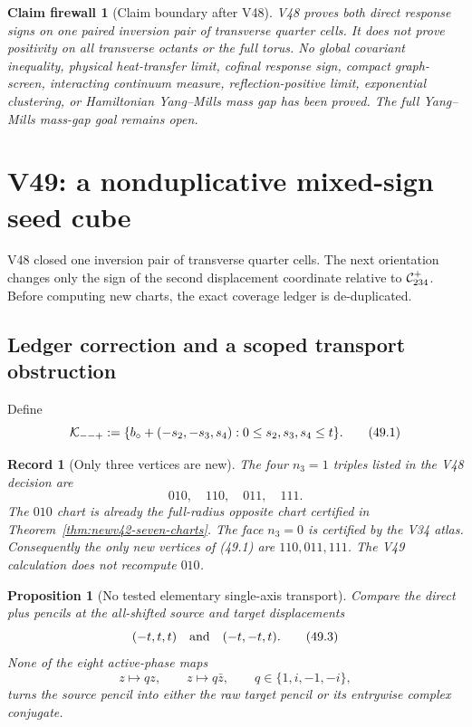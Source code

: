 \documentclass[11pt,oneside]{article}
\newtheorem{proposition}[theorem]{Proposition}
\newtheorem{firewall}[theorem]{Claim firewall}
\newtheorem{record}[theorem]{Record}
\theoremstyle{definition}
\theoremstyle{remark}
\begin{document}
\begin{firewall}[Claim boundary after V48]
\label{fire:newv48-final}
V48 proves both direct response signs on one paired inversion pair
of transverse quarter cells.  It does not prove positivity on all
transverse octants or the full torus.  No global covariant
inequality, physical heat-transfer limit, cofinal response sign,
compact graph-screen, interacting continuum measure,
reflection-positive limit, exponential clustering, or Hamiltonian
Yang--Mills mass gap has been proved.  The full Yang--Mills
mass-gap goal remains open.
\end{firewall}

\section{V49: a nonduplicative mixed-sign seed cube}
\label{sec:newv49-mixed-seed-cube}

V48 closed one inversion pair of transverse quarter cells.  The
next orientation changes only the sign of the second displacement
coordinate relative to \({\cal C}_{234}^{+}\).  Before computing
new charts, the exact coverage ledger is de-duplicated.

\subsection{Ledger correction and a scoped transport obstruction}

Define
\[
 {\cal K}_{--+}:=
 \{b_\circ+(-s_2,-s_3,s_4):
             0\le s_2,s_3,s_4\le t\}.                 \tag{49.1}
\]

\begin{record}[Only three vertices are new]
\label{rec:newv49-dedup}
The four \(n_3=1\) triples listed in the V48 decision are
\[
 010,\quad110,\quad011,\quad111.                       \tag{49.2}
\]
The \(010\) chart is already the full-radius opposite chart
certified in Theorem~\ref{thm:newv42-seven-charts}.  The face
\(n_3=0\) is certified by the V34 atlas.  Consequently the only
new vertices of (49.1) are \(110,011,111\).  The V49 calculation
does not recompute \(010\).
\end{record}

\begin{proposition}[No tested elementary single-axis transport]
\label{prop:newv49-transport}
Compare the direct plus pencils at the all-shifted source and
target displacements
\[
 (-t,t,t)\quad\hbox{and}\quad(-t,-t,t).                \tag{49.3}
\]
None of the eight active-phase maps
\[
 z\longmapsto qz,\qquad z\longmapsto q\bar z,
 \qquad q\in\{1,i,-1,-i\},                             \tag{49.4}
\]
turns the source pencil into either the raw target pencil or its
entrywise complex conjugate.
\end{proposition}
\end{document}
